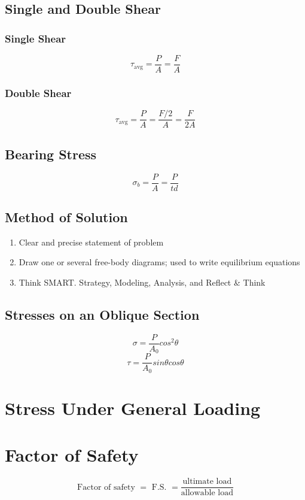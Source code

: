 \documentclass[10pt,landscape]{article}
\begin{document}
\begin{multicols}{3}
\subsection{Single and Double Shear}
\subsubsection{Single Shear}
\begin{equation}
    \tau_{\text{avg}}=\frac{P}{A}=\frac{F}{A}
\end{equation}
\subsubsection{Double Shear}
\begin{equation}
    \tau_{\text{avg}}=\frac{P}{A}=\frac{F/2}{A}=\frac{F}{2A}    
\end{equation}
\subsection{Bearing Stress}
\begin{equation}
    \sigma_b=\frac{P}{A}=\frac{P}{td}
\end{equation}
\subsection{Method of Solution}
\begin{enumerate}
  \item Clear and precise statement of problem
  \item Draw one or several free-body diagrams; used to write equilibrium equations
  \item Think SMART. Strategy, Modeling, Analysis, and Reflect \& Think
\end{enumerate}
\subsection{Stresses on an Oblique Section}
\begin{equation}
    \sigma=\frac{P}{A_0}cos^2\theta
\end{equation}
\begin{equation}
    \tau=\frac{P}{A_0}sin\theta cos\theta
\end{equation}
\section{Stress Under General Loading}
\section{Factor of Safety}
\begin{equation}
    \text{Factor of safety }=\text{ F.S. }=\frac{\text{ultimate load}}{\text{allowable load}}
\end{equation}


\end{multicols}
\end{document}
